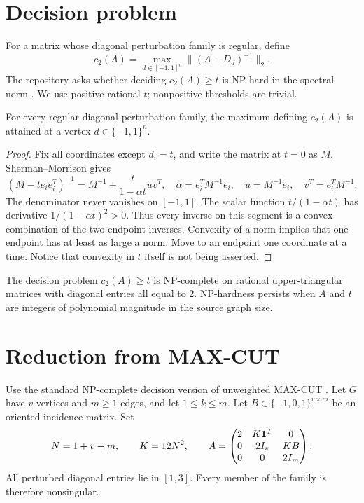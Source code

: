 

\begin{abstract}
We prove NP-hardness, under a polynomial-time many-one reduction, of deciding whether the maximum spectral norm of $(A-\diag d)^{-1}$ over $d\in[-1,1]^n$ is at least a rational threshold. Hardness holds for integer upper-triangular $A$ with every diagonal entry equal to 2; the entire diagonal perturbation family is automatically regular. The decision problem restricted to rational upper-triangular matrices with this diagonal is NP-complete.
\end{abstract}
\section{Decision problem}
For a matrix whose diagonal perturbation family is regular, define
\[
 c_2(A)=\max_{d\in[-1,1]^n}\|(A-D_d)^{-1}\|_2.
\]
The repository asks whether deciding $c_2(A)\ge t$ is NP-hard in the spectral norm \cite{repo,condition}. We use positive rational $t$; nonpositive thresholds are trivial.
\begin{lemma}\label{lem:vertices}
For every regular diagonal perturbation family, the maximum defining $c_2(A)$ is attained at a vertex $d\in\{-1,1\}^n$.
\end{lemma}
\begin{proof}
Fix all coordinates except $d_i=t$, and write the matrix at $t=0$ as $M$. Sherman--Morrison gives
\[
 (M-te_ie_i^T)^{-1}=M^{-1}+\frac{t}{1-\alpha t}uv^T,
 \quad \alpha=e_i^TM^{-1}e_i,
 \quad u=M^{-1}e_i,\quad v^T=e_i^TM^{-1}.
\]
The denominator never vanishes on $[-1,1]$. The scalar function $t/(1-\alpha t)$ has derivative $1/(1-\alpha t)^2>0$. Thus every inverse on this segment is a convex combination of the two endpoint inverses. Convexity of a norm implies that one endpoint has at least as large a norm. Move to an endpoint one coordinate at a time. Notice that convexity in $t$ itself is not being asserted.
\end{proof}
\begin{theorem}\label{thm:hard}
The decision problem $c_2(A)\ge t$ is NP-complete on rational upper-triangular matrices with diagonal entries all equal to 2. NP-hardness persists when $A$ and $t$ are integers of polynomial magnitude in the source graph size.
\end{theorem}
\section{Reduction from MAX-CUT}
Use the standard NP-complete decision version of unweighted MAX-CUT \cite{maxcut}. Let $G$ have $v$ vertices and $m\ge1$ edges, and let $1\le k\le m$. Let $B\in\{-1,0,1\}^{v\times m}$ be an oriented incidence matrix. Set
\[
 N=1+v+m,\qquad K=12N^2,\qquad
 A=\begin{pmatrix}
 2&K\mathbf 1^T&0\\
 0&2I_v&KB\\
 0&0&2I_m
 \end{pmatrix}.
\]
All perturbed diagonal entries lie in $[1,3]$. Every member of the family is therefore nonsingular.

